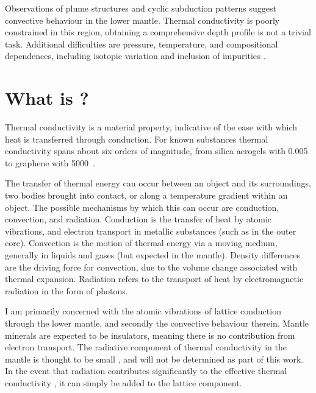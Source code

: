 Observations of plume structures and cyclic subduction patterns \citep[see][]{Garnero2008} suggest convective behaviour in the lower mantle. Thermal conductivity is poorly constrained in this region, obtaining a comprehensive depth profile is not a trivial task. Additional difficulties are pressure, temperature, and compositional dependences, including isotopic variation \citep{Tang2010,Dalton2013,Tang2014} and inclusion of impurities \citep{Manthilake2011,Ammann2014,Ohta2014}.
















\section{What is \tc?}

Thermal conductivity is a material property, indicative of the ease with which heat is transferred through conduction. For known substances thermal conductivity spans about six orders of magnitude, from silica aerogels with 0.005~\wmk \citep{Lee1995} to graphene with 5000~\wmk \citep{Baladin2008}.

The transfer of thermal energy can occur between an object and its surroundings, two bodies brought into contact, or along a temperature gradient within an object. The possible mechanisms by which this can occur are conduction, convection, and radiation. Conduction is the transfer of heat by atomic vibrations, and electron transport in metallic substances (such as in the outer core). Convection is the motion of thermal energy via a moving medium, generally in liquids and gases (but expected in the mantle). Density differences are the driving force for convection, due to the volume change associated with thermal expansion. Radiation refers to the transport of heat by electromagnetic radiation in the form of photons.

I am primarily concerned with the atomic vibrations of lattice conduction through the lower mantle, and secondly the convective behaviour therein. Mantle minerals are expected to be insulators, meaning there is no contribution from electron transport. The radiative component of thermal conductivity in the mantle is thought to be small \citep{Goncharov2008}, and will not be determined as part of this work. In the event that radiation contributes significantly to the effective thermal conductivity \citep{Keppler2008}, it can simply be added to the lattice component.

